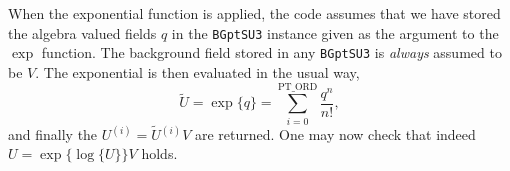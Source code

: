 \documentclass[a4paper]{scrartcl}
\newcommand{\ord}[1]{\ensuremath{^{(#1)}}}
\begin{document}
When the exponential function is applied, the code assumes that we
have stored the algebra valued fields $q$ in the \texttt{BGptSU3}
instance given as the argument to the $\exp$ function. The background
field stored in any \texttt{BGptSU3} is \emph{always} assumed to be
$V$. The exponential is then evaluated in the usual way,
%
\begin{equation}
  \label{eq:14}
  \tilde U = \exp \{ q\} = \sum_{i = 0}^{\mathrm{PT\_ORD}} \frac {q^n}{n!},
\end{equation}
%
and finally the $U\ord i = {\tilde U}\ord i V$ are returned. One may
now check that indeed $U = \exp\{\log\{U\}\}V$ holds.
\end{document}
